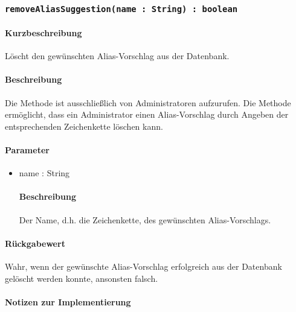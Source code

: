 \subsubsection{\texttt{removeAliasSuggestion(name : String) : boolean}}%
\paragraph*{Kurzbeschreibung}
Löscht den gewünschten Alias-Vorschlag aus der Datenbank.
\paragraph*{Beschreibung}
Die Methode ist ausschließlich von Administratoren aufzurufen.
Die Methode ermöglicht, dass ein Administrator einen Alias-Vorschlag durch Angeben der entsprechenden Zeichenkette löschen kann.
\paragraph*{Parameter}
\begin{itemize}
	\item name : String
		\paragraph*{Beschreibung}
		Der Name, d.h. die Zeichenkette, des gewünschten Alias-Vorschlags.
\end{itemize}
\paragraph*{Rückgabewert}
Wahr, wenn der gewünschte Alias-Vorschlag erfolgreich aus der Datenbank gelöscht werden konnte, ansonsten falsch.

\paragraph*{Notizen zur Implementierung}%
